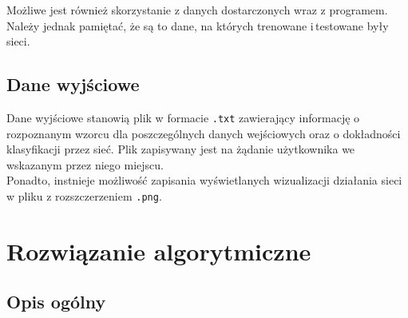 \documentclass[a4paper,12pt]{article}
\begin{document}
Możliwe jest również skorzystanie z danych dostarczonych wraz z programem. Należy jednak pamiętać, że są to dane, na których trenowane i\,testowane były sieci.

\subsection{Dane wyjściowe}

Dane wyjściowe stanowią plik w formacie \texttt{.txt} zawierający informację o rozpoznanym wzorcu dla poszczególnych danych wejściowych oraz o dokładności klasyfikacji przez sieć. Plik zapisywany jest na żądanie użytkownika we wskazanym przez niego miejscu.\\

Ponadto, instnieje możliwość zapisania wyświetlanych wizualizacji działania sieci w pliku z rozszczerzeniem \texttt{.png}.

\section{Rozwiązanie algorytmiczne}

\subsection{Opis ogólny}
\end{document}

